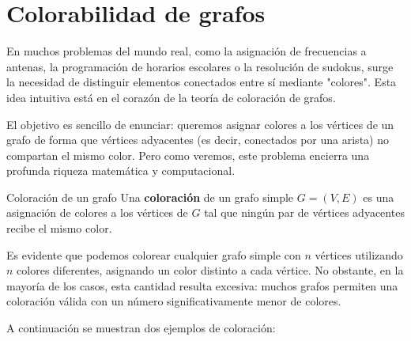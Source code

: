 


\section{Colorabilidad de grafos}

En muchos problemas del mundo real, como la asignación de frecuencias a antenas, la programación de horarios escolares o la resolución de sudokus, surge la necesidad de distinguir elementos conectados entre sí mediante "colores". Esta idea intuitiva está en el corazón de la teoría de coloración de grafos.

El objetivo es sencillo de enunciar: queremos asignar colores a los vértices de un grafo de forma que vértices adyacentes (es decir, conectados por una arista) no compartan el mismo color. Pero como veremos, este problema encierra una profunda riqueza matemática y computacional.

\begin{definitionblock}{Coloración de un grafo}
Una \textbf{coloración} de un grafo simple \( G = (V,E) \) es una asignación de colores a los vértices de \( G \) tal que ningún par de vértices adyacentes recibe el mismo color.
\end{definitionblock}

\bigskip


Es evidente que podemos colorear cualquier grafo simple con \( n \) vértices utilizando \( n \) colores diferentes, asignando un color distinto a cada vértice. No obstante, en la mayoría de los casos, esta cantidad resulta excesiva: muchos grafos permiten una coloración válida con un número significativamente menor de colores.


\noindent A continuación se muestran dos ejemplos de coloración:

